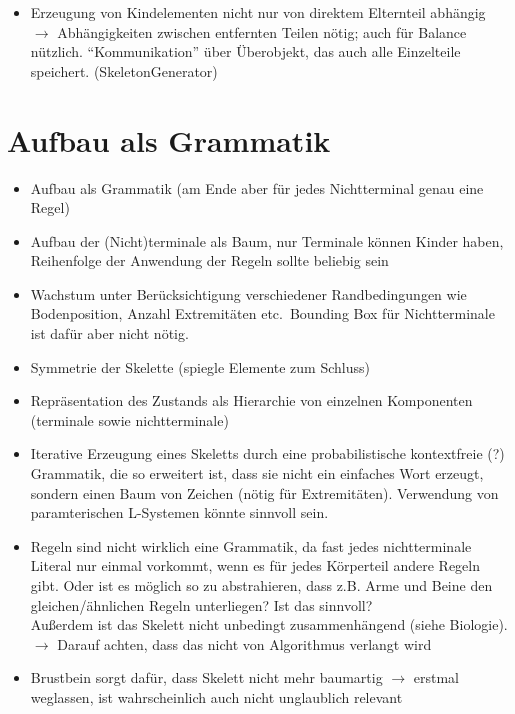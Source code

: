 \begin{itemize}
 \item Erzeugung von Kindelementen nicht nur von direktem Elternteil abhängig $\rightarrow$ Abhängigkeiten zwischen entfernten Teilen nötig; auch für Balance nützlich. "`Kommunikation"' über Überobjekt, das auch alle Einzelteile speichert. (SkeletonGenerator)
\end{itemize}


\section{Aufbau als Grammatik}

\begin{itemize}
  \item Aufbau als Grammatik (am Ende aber für jedes Nichtterminal genau eine Regel)
  \item Aufbau der (Nicht)terminale als Baum, nur Terminale können Kinder haben, Reihenfolge der Anwendung der Regeln sollte beliebig sein
  \item Wachstum unter Berücksichtigung verschiedener Randbedingungen wie Bodenposition, Anzahl Extremitäten etc.\ Bounding Box für Nichtterminale ist dafür aber nicht nötig.
  \item Symmetrie der Skelette (spiegle Elemente zum Schluss)
  \item Repräsentation des Zustands als Hierarchie von einzelnen Komponenten (terminale sowie nichtterminale)
 \end{itemize}
 
 \begin{itemize}
  \item Iterative Erzeugung eines Skeletts durch eine probabilistische kontextfreie (?) Grammatik, die so erweitert ist, dass sie nicht ein einfaches Wort erzeugt, sondern einen Baum von Zeichen (nötig für Extremitäten). Verwendung von paramterischen L-Systemen \cite{Paramteric_L-Systems} könnte sinnvoll sein.
  
  \item Regeln sind nicht wirklich eine Grammatik, da fast jedes nichtterminale Literal nur einmal vorkommt, wenn es für jedes Körperteil andere Regeln gibt. Oder ist es möglich so zu abstrahieren, dass z.B. Arme und Beine den gleichen/ähnlichen Regeln unterliegen? Ist das sinnvoll? \\
  Außerdem ist das Skelett nicht unbedingt zusammenhängend (siehe Biologie). $\rightarrow$ Darauf achten, dass das nicht von Algorithmus verlangt wird
  
  \item Brustbein sorgt dafür, dass Skelett nicht mehr baumartig $\rightarrow$ erstmal weglassen, ist wahrscheinlich auch nicht unglaublich relevant
 \end{itemize}

